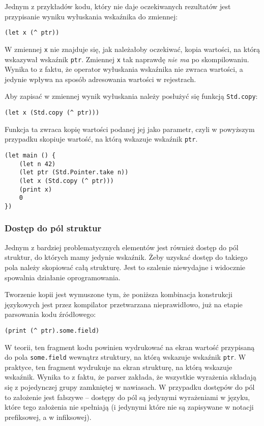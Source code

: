 Jednym z przykładów kodu, który nie daje oczekiwanych rezultatów jest
przypisanie wyniku wyłuskania wskaźnika do zmiennej:
\begin{lstlisting}
(let x (^ ptr))
\end{lstlisting}
W zmiennej \texttt{x} nie znajduje się, jak należałoby oczekiwać, kopia
wartości, na którą wskazywał wskaźnik \texttt{ptr}. Zmiennej \texttt{x} tak
naprawdę \emph{nie ma} po skompilowaniu. Wynika to z faktu, że operator
wyłuskania wskaźnika nie zwraca wartości, a jedynie wpływa na sposób adresowania
wartości w rejestrach.

Aby zapisać w zmiennej wynik wyłuskania należy posłużyć się funkcją
\texttt{Std.copy}:
\begin{lstlisting}
(let x (Std.copy (^ ptr)))
\end{lstlisting}
Funkcja ta zwraca kopię wartości podanej jej jako parametr, czyli w powyższym
przypadku skopiuje wartość, na którą wskazuje wskaźnik \texttt{ptr}.

\begin{lstlisting}[caption={Poprawnie działający przykład dowiązania do wyłuskania}]
(let main () {
    (let n 42)
    (let ptr (Std.Pointer.take n))
    (let x (Std.copy (^ ptr)))
    (print x)
    0
})
\end{lstlisting}

\subsubsection*{Dostęp do pól struktur}

Jednym z bardziej problematycznych elementów jest również dostęp do pól
struktur, do których mamy jedynie wskaźnik. Żeby uzyskać dostęp do takiego pola
należy skopiować całą strukturę. Jest to szalenie niewydajne i widocznie
spowalnia działanie oprogramowania.

Tworzenie kopii jest wymuszone tym, że poniższa kombinacja konstrukcji
językowych jest przez kompilator przetwarzana nieprawidłowo, już na etapie
parsowania kodu źródłowego:
\begin{lstlisting}
(print (^ ptr).some.field)
\end{lstlisting}
W teorii, ten fragment kodu powinien wydrukować na ekran wartość przypisaną do
pola \texttt{some.field} wewnątrz struktury, na którą wskazuje wskaźnik
\texttt{ptr}. W praktyce, ten fragment wydrukuje na ekran strukturę, na którą
wskazuje wskaźnik. Wynika to z faktu, że parser zakłada, że wszystkie wyrażenia
składają się z pojedynczej grupy zamkniętej w nawiasach. W przypadku dostępów do
pól to założenie jest fałszywe -- dostępy do pól są jedynymi wyrażeniami w
języku, które tego założenia nie spełniają (i jedynymi które nie są zapisywane w
notacji prefiksowej, a w infiksowej).

